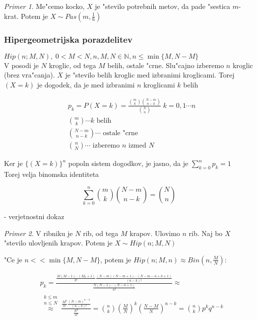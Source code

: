 \documentclass[a4paper,12pt]{article}
\theoremstyle{definition}
\theoremstyle{remark}
\newtheorem*{ex}{Primer}
\newcommand{\N}{\mathbb{N}}
\begin{document}
\begin{ex}
    Me"cemo kocko, $X$ je "stevilo potrebnih metov, da pade "sestica $m$-krat. Potem je $X \sim Pas(m, \frac{1}{6})$
\end{ex}

\subsubsection{Hipergeometrijska porazdelitev}

$Hip(n; M, N), \; 0 < M < N, n,M,N \in \N, n \leq \min\{M, N-M\}$ \\
V posodi je $N$ kroglic, od tega $M$ belih, ostale "crne. Slu"cajno izberemo $n$ kroglic (brez vra"canja). $X$ je
"stevilo belih kroglic med izbranimi kroglicami. Torej $(X=k)$ je dogodek, da je med izbranimi $n$ kroglicami $k$
belih

\begin{align*}
    &p_k = P(X = k) = \frac{\binom{m}{k} \binom{N-m}{n-k}}{\binom{N}{n}} \; k = 0, 1 \cdots n \\
    &\binom{m}{k} \cdots k \text{ belih} \\
    &\binom{N-m}{n-k} \cdots \text{ ostale "crne} \\
    &\binom{n}{N} \cdots \text{ izberemo } n \text{ izmed } N
\end{align*}

Ker je $\{(X = k)\}^n$ popoln sistem dogodkov, je jasno, da je $\sum_{k=0}^{n} p_k = 1$ \\
Torej velja binomska identiteta

\begin{equation*}
    \sum_{k=0}^{n} \binom{m}{k} \binom{N-m}{n-k} = \binom{N}{n}
\end{equation*}

- verjetnostni dokaz

\begin{ex}
    V ribniku je $N$ rib, od tega $M$ krapov. Ulovimo $n$ rib. Naj bo $X$ "stevilo ulovljenih krapov. Potem je
    $X \sim Hip(n; M, N)$
\end{ex}

"Ce je $n << \min\{M, N-M\}$, potem je $Hip(n; M, n) \approx Bin(n, \frac{M}{N})$:

\begin{align*}
    &p_k = \frac{\frac{M(M-1) \cdots (M_k+1)}{k!} \frac{(N-m)(N-m+1) \cdots (N-m-n+k+1)}{(n-k)!}}
        {\frac{N(N-1) \cdots (N-n+1)}{n!}} \approx \\
    &\stackrel{\substack{k \leq m \\ n \leq N}}{\approx} \frac{\frac{M^k}{k!} \frac{(N-m)^{n-k}}{(n-k)!}}
        {\frac{N^n}{n!}} = \binom{n}{k} (\frac{M}{N})^k (\frac{N-M}{N})^{n-k} = \binom{n}{k} p^k q^{n-k}
\end{align*}
\end{document}
